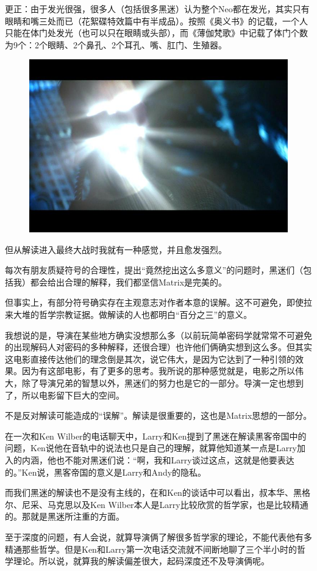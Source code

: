 \documentclass[UTF8]{ctexart}
\begin{document}
更正：由于发光很强，很多人（包括很多黑迷）认为整个Neo都在发光，其实只有眼睛和嘴三处而已（花絮碟特效篇中有半成品）。按照《奥义书》的记载，一个人只能在体门处发光（也可以只在眼睛或头部），而《薄伽梵歌》中记载了体门个数为9个：2个眼睛、2个鼻孔、2个耳孔、嘴、肛门、生殖器。

\begin{figure}[htb]
\centering
\includegraphics[width=0.5\linewidth]{fig/073ad0097517c886d0581b54.jpg}
\end{figure}

但从解读进入最终大战时我就有一种感觉，并且愈发强烈。

每次有朋友质疑符号的合理性，提出“竟然挖出这么多意义”的问题时，黑迷们（包括我）都会给出合理的解释，我们都坚信Matrix是完美的。

但事实上，有部分符号确实存在主观意志对作者本意的误解。这不可避免，即使拉来大堆的哲学宗教证据。做解读的人也都明白“百分之三”的意义。

我想说的是，导演在某些地方确实没想那么多（以前玩简单密码学就常常不可避免的出现解码人对密码的多种解释，还很合理）也许他们俩确实想到这么多。但其实这电影直接传达他们的理念倒是其次，说它伟大，是因为它达到了一种引领的效果。因为有这部电影，有了更多的思考。我所说的那种感觉就是，电影之所以伟大，除了导演兄弟的智慧以外，黑迷们的努力也是它的一部分。导演一定也想到了，所以电影留下巨大的空间。

不是反对解读可能造成的“误解”。解读是很重要的，这也是Matrix思想的一部分。

在一次和Ken Wilber的电话聊天中，Larry和Ken提到了黑迷在解读黑客帝国中的问题，Ken说他在音轨中的说法也只是自己的理解，就算他知道某一点是Larry加入的内涵，他也不能对黑迷们说：“啊，我和Larry谈过这点，这就是他要表达的。”Ken说，黑客帝国的意义是Larry和Andy的隐私。

而我们黑迷的解读也不是没有主线的，在和Ken的谈话中可以看出，叔本华、黑格尔、尼采、马克思以及Ken Wilber本人是Larry比较欣赏的哲学家，也是比较精通的。那就是黑迷所注重的方面。

至于深度的问题，有人会说，就算导演俩了解很多哲学家的理论，不能代表他有多精通那些哲学。但是Ken和Larry第一次电话交流就不间断地聊了三个半小时的哲学理论。所以说，就算我的解读偏差很大，起码深度还不及导演俩呢。
\end{document}

